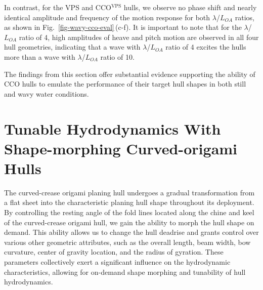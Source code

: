 In contrast, for the VPS and CCO\(^\textrm{VPS}\) hulls, we observe no phase shift and nearly identical amplitude and frequency of the motion response for both \(\lambda\)/\(L_{OA}\) ratios, as shown in Fig.~\ref{fig-wavy-cco-eval}\,(c-f). It is important to note that for the \(\lambda\)/\(L_{OA}\) ratio of 4, high amplitudes of heave and pitch motion are observed in all four hull geometries, indicating that a wave with \(\lambda\)/\(L_{OA}\) ratio of 4 excites the hulls more than a wave with \(\lambda\)/\(L_{OA}\) ratio of 10.

The findings from this section offer substantial evidence supporting the ability of CCO hulls to emulate the performance of their target hull shapes in both still and wavy water conditions.

\section{Tunable Hydrodynamics With Shape-morphing Curved-origami Hulls}\label{05-sec-tunable-hydrodynamics}
The curved-crease origami planing hull undergoes a gradual transformation from a flat sheet into the characteristic planing hull shape throughout its deployment. By controlling the resting angle of the fold lines located along the chine and keel of the curved-crease origami hull, we gain the ability to morph the hull shape on demand. This ability allows us to change the hull deadrise and grants control over various other geometric attributes, such as the overall length, beam width, bow curvature, center of gravity location, and the radius of gyration. These parameters collectively exert a significant influence on the hydrodynamic characteristics, allowing for on-demand shape morphing and tunability of hull hydrodynamics.

